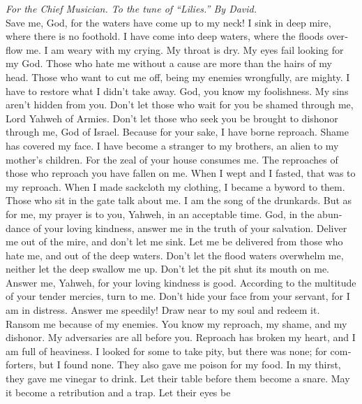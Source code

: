 \begin{paracol}{2}
\begin{otherlanguage}{english}
\emph{For the Chief Musician. To the tune of ``Lilies.'' By David.}\\
 Save me, God, for the waters have come up to my neck!
 I sink in deep mire, where there is no foothold. I have
come into deep waters, where the floods overflow me.  I am
weary with my crying. My throat is dry. My eyes fail looking for my God.
 Those who hate me without a cause are more than the hairs
of my head. Those who want to cut me off, being my enemies wrongfully,
are mighty. I have to restore what I didn't take away. 
God, you know my foolishness. My sins aren't hidden from you.
 Don't let those who wait for you be shamed through me,
Lord Yahweh of Armies. Don't let those who seek you be brought to
dishonor through me, God of Israel.  Because for your
sake, I have borne reproach. Shame has covered my face.  I
have become a stranger to my brothers, an alien to my mother's children.
 For the zeal of your house consumes me. The reproaches of
those who reproach you have fallen on me.  When I wept
and I fasted, that was to my reproach.  When I made
sackcloth my clothing, I became a byword to them.  Those
who sit in the gate talk about me. I am the song of the drunkards.
 But as for me, my prayer is to you, Yahweh, in an
acceptable time. God, in the abundance of your loving kindness, answer
me in the truth of your salvation.  Deliver me out of the
mire, and don't let me sink. Let me be delivered from those who hate me,
and out of the deep waters.  Don't let the flood waters
overwhelm me, neither let the deep swallow me up. Don't let the pit shut
its mouth on me.  Answer me, Yahweh, for your loving
kindness is good. According to the multitude of your tender mercies,
turn to me.  Don't hide your face from your servant, for
I am in distress. Answer me speedily!  Draw near to my
soul and redeem it. Ransom me because of my enemies.  You
know my reproach, my shame, and my dishonor. My adversaries are all
before you.  Reproach has broken my heart, and I am full
of heaviness. I looked for some to take pity, but there was none; for
comforters, but I found none.  They also gave me poison
for my food. In my thirst, they gave me vinegar to drink.
 Let their table before them become a snare. May it
become a retribution and a trap.  Let their eyes be

\end{otherlanguage}
\end{paracol}
